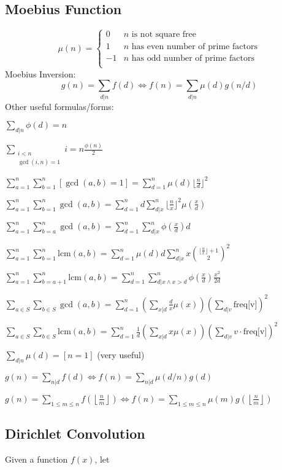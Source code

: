 \subsection{Moebius Function}
\[
	\mu(n) = \begin{cases} 0 & n \textrm{ is not square free}\\ 1 & n \textrm{ has even number of prime factors}\\ -1 & n \textrm{ has odd number of prime factors}\\\end{cases}
\]
  Moebius Inversion:
  \[ g(n) = \sum_{d|n} f(d) \Leftrightarrow f(n) = \sum_{d|n} \mu(d)g(n/d) \]
  Other useful formulas/forms:

  $ \sum_{d|n} \phi(d) = n $
  
  $\sum_{\substack{i<n\\ \gcd(i,n)=1}} i = n \frac{\phi(n)}{2} $

$ \sum_{a=1}^n \sum_{b=1}^n [ \gcd(a, b) = 1] = \sum_{d=1}^n \mu(d) {\lfloor \frac{n}{d} \rfloor}^2 $

$ \sum_{a=1}^n \sum_{b=1}^n \gcd(a, b) = \sum_{d=1}^n d \sum_{d|x}^n {\lfloor \frac{n}{x} \rfloor}^2 \mu{(\frac{x}{d})} $

$ \sum_{a=1}^n \sum_{b=a}^n \gcd(a, b) = \sum_{d=1}^n \sum_{d|x}^n \phi{(\frac{x}{d})} d $

$ \sum_{a=1}^n \sum_{b=1}^n \text{lcm}(a, b) = \sum_{d=1}^n \mu(d) d  \sum_{d|x}^n x \binom{{\lfloor \frac{n}{x} \rfloor} + 1}{2}^2 $

$ \sum_{a=1}^n \sum_{b=a+1}^n \text{lcm}(a, b) = \sum_{d=1}^n \sum_{d|x \land x>d}^n \phi{(\frac{x}{d})} \frac{x^2}{2d} $

$ \sum_{a \in S} \sum_{b \in S} \gcd(a, b) = \sum_{d=1}^n (\sum_{x|d} \frac{d}{x} \mu(x)) (\sum_{d|v} \text{freq[v]})^2 $

$ \sum\limits_{a \in S} \sum\limits_{b \in S} \text{lcm}(a, b) = \sum_{d=1}^n \frac{1}{d} (\sum_{x|d} x \mu(x)) (\sum_{d|v} v \cdot \text{freq[v]})^2 $

  $ \sum_{d | n} \mu(d) = [ n = 1] $ (very useful)

  $ g(n) = \sum_{n|d} f(d) \Leftrightarrow f(n) = \sum_{n|d} \mu(d/n)g(d)$

 $ g(n) = \sum_{1 \leq m \leq n} f(\left\lfloor\frac{n}{m}\right \rfloor ) \Leftrightarrow f(n) = \sum_{1\leq m\leq n} \mu(m)g(\left\lfloor\frac{n}{m}\right\rfloor)$


\subsection{Dirichlet Convolution} 
	Given a function $f(x)$, let 

